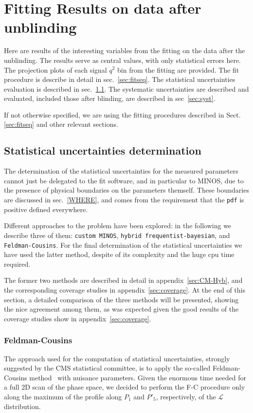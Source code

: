 \section{Fitting Results on data after unblinding}
\label{sec:result}

Here are results of the interesting variables from the fitting on the data after the unblinding.
The results serve as central values, with only statistical errors here.
The projection plots of each signal $q^2$ bin from the fitting are provided.
The fit procedure is describe in detail in sec.~\ref{sec:fitseq}.
The statistical uncertainties evaluation is described in sec.~\ref{sec:statUncert}.
The systematic uncertainties are described and evaluated, included those after blinding, are described in sec~\ref{sec:syst}.

If not otherwise specified, we are using the fitting procedures described in Sect.\ref{sec:fitseq} and other relevant sections.


\subsection{Statistical uncertainties determination}\label{sec:statUncert}

The determination of the statistical uncertainties for the measured parameters cannot just be delegated to the fit software, and in particular to MINOS, due to the presence of physical boundaries on the parameters themself.
These boundaries are discussed in sec.~\ref{WHERE}, and comes from the requirement that the {\tt pdf} is positive defined everywhere.

Different approaches to the problem have been explored: in the following we describe three of them: {\tt custom MINOS}, {\tt hybrid frequentist-bayesian}, and {\tt Feldman-Cousins}.
For the final determination of the statistical uncertainties we have used the latter method, despite of its complexity and the huge cpu time required.

The former two methods are described in detail in appendix~\ref{sec:CM-Hyb}, and the corresponding coverage studies in appendix~\ref{sec:coverage}.
At the end of this section, a detailed comparison of the three methods will be presented, showing the nice agreement among them, as was expected given the good results of the coverage studies show in appendix~\ref{sec:coverage}.

\subsubsection{Feldman-Cousins}
The approach used for the computation of statistical uncertainties, strongly suggested by the CMS statistical committee, is to apply the so-called Feldman-Cousins method~\cite{FC} with nuisance parameters.
Given the enormous time needed for a full 2D scan of the phase space, we decided to perform the F-C procedure only along the maximum of the profile along $P_1$ and $P'_5$, respectively, of the $\mathcal{L}$ distribution.

